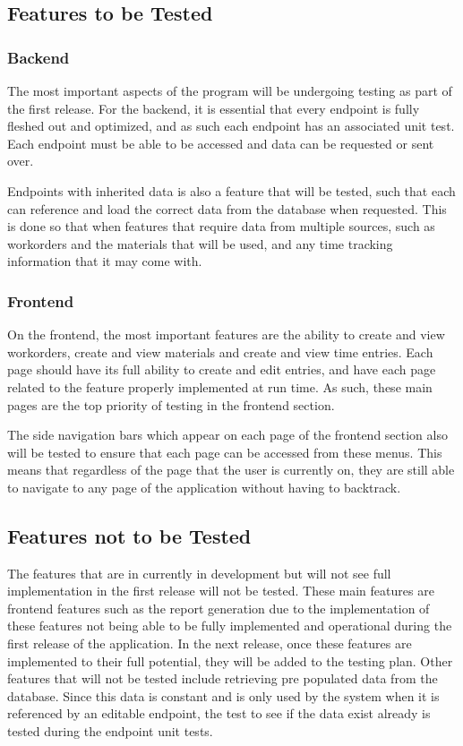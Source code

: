 {{{\subsection{Features to be Tested}
\subsubsection{Backend}
The most important aspects of the program will be undergoing testing as part of the first release. For the backend, it is essential that every endpoint is fully fleshed out and optimized, and as such each endpoint has an associated unit test. Each endpoint must be able to be accessed and data can be requested or sent over.   
\newline
{\setlength{\parindent}{0cm}

Endpoints with inherited data is also a feature that will be tested, such that each can reference and load the correct data from the database when requested. This is done so that when features that require data from multiple sources, such as workorders and the materials that will be used, and any time tracking information that it may come with. 

\subsubsection{Frontend}
On the frontend, the most important features are the ability to create and view workorders, create and view materials and create and view time entries. Each page should have its full ability to create and edit entries, and have each page related to the feature properly implemented at run time. As such, these main pages are the top priority of testing in the frontend section. 
\newline
{\setlength{\parindent}{0cm}
The side navigation bars which appear on each page of the frontend section also will be tested to ensure that each page can be accessed from these menus. This means that regardless of the page that the user is currently on, they are still able to navigate to any page of the application without having to backtrack. 

\subsection{Features not to be Tested}
The features that are in currently in development but will not see full implementation in the first release will not be tested. These main features are frontend features such as the report generation due to the implementation of these features not being able to be fully implemented and operational during the first release of the application. In the next release, once these features are implemented to their full potential, they will be added to the testing plan. Other features that will not be tested include retrieving pre populated data from the database. Since this data is constant and is only used by the system when it is referenced by an editable endpoint, the test to see if the data exist already is tested during the endpoint unit tests. 
\newline
{\setlength{\parindent}{0cm}

}}}}}}
